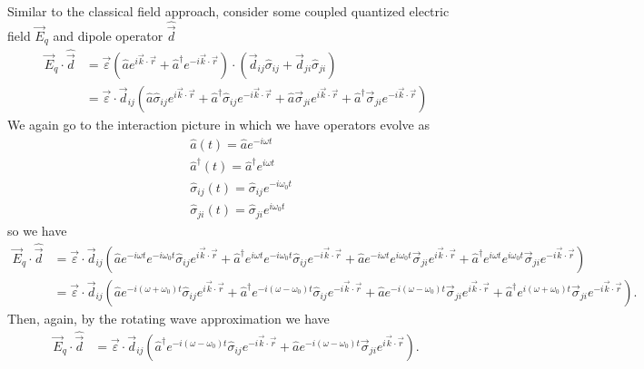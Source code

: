 \documentclass[aps,pra,showpacs,amsmath,amssymb,nofootinbib,longbibliography,superscriptaddress
]{revtex4-1}
\theoremstyle{definition}
\theoremstyle{remark}
\newcommand{\0}{\hat{0}}
\begin{document}
Similar to the classical field approach, consider some coupled quantized electric field $\vec{E}_q$ and dipole operator $\hat{\vec{d}}$
\begin{align}
    \vec{E}_q \cdot \hat{\vec{d}} &=
    \vec{\varepsilon} \left(\hat{a} e^{i \vec{k} \cdot \vec{r}} + \hat{a}^{\dagger} e^{-i \vec{k} \cdot \vec{r}}\right) \cdot \left(\vec{d}_{ij} \hat{\sigma}_{ij} + \vec{d}_{ji} \hat{\sigma}_{ji}\right)\nonumber \\
    &=
    \vec{\varepsilon} \cdot \vec{d}_{ij}\left(
        \hat{a} \hat{\sigma}_{ij} e^{i \vec{k} \cdot \vec{r}} +
        \hat{a}^{\dagger} \hat{\sigma}_{ij} e^{-i \vec{k} \cdot \vec{r}} +
        \hat{a} \vec{\sigma}_{ji} e^{i \vec{k} \cdot \vec{r}} +
        \hat{a}^{\dagger} \vec{\sigma}_{ji} e^{-i \vec{k} \cdot \vec{r}}
    \right)
\end{align}
We again go to the interaction picture in which we have operators evolve as
\begin{align}
    &\hat{a}(t) = \hat{a} e^{-i \omega t}\\
    &\hat{a}^{\dagger}(t) = \hat{a}^{\dagger} e^{i \omega t}\\
    &\hat{\sigma}_{ij}(t) = \hat{\sigma}_{ij} e^{-i \omega_0 t}\\
    &\hat{\sigma}_{ji}(t) = \hat{\sigma}_{ji} e^{i \omega_0 t}
\end{align}
so we have
\begin{align}
    \vec{E}_q \cdot \hat{\vec{d}} &=
    \vec{\varepsilon} \cdot \vec{d}_{ij}\left(
        \hat{a} e^{-i \omega t} e^{-i \omega_0 t} \hat{\sigma}_{ij} e^{i \vec{k} \cdot \vec{r}} +
        \hat{a}^{\dagger} e^{i \omega t} e^{-i \omega_0 t} \hat{\sigma}_{ij} e^{-i \vec{k} \cdot \vec{r}} +
        \hat{a} e^{-i \omega t} e^{i \omega_0 t}\vec{\sigma}_{ji} e^{i \vec{k} \cdot \vec{r}} +
        \hat{a}^{\dagger} e^{i \omega t} e^{i \omega_0 t}\vec{\sigma}_{ji} e^{-i \vec{k} \cdot \vec{r}}
    \right) \nonumber \\
    &=
    \vec{\varepsilon} \cdot \vec{d}_{ij}\left(
        \hat{a} e^{-i (\omega + \omega_0) t} \hat{\sigma}_{ij} e^{i \vec{k} \cdot \vec{r}} +
        \hat{a}^{\dagger} e^{-i (\omega - \omega_0) t} \hat{\sigma}_{ij} e^{-i \vec{k} \cdot \vec{r}} +
        \hat{a} e^{-i (\omega - \omega_0) t}\vec{\sigma}_{ji} e^{i \vec{k} \cdot \vec{r}} +
        \hat{a}^{\dagger} e^{i (\omega +\omega_0) t}\vec{\sigma}_{ji} e^{-i \vec{k} \cdot \vec{r}}
    \right). 
\end{align}
Then, again, by the rotating wave approximation we have
\begin{align}
    \vec{E}_q \cdot \hat{\vec{d}} &=
    \vec{\varepsilon} \cdot \vec{d}_{ij}\left(
        \hat{a}^{\dagger} e^{-i (\omega - \omega_0) t} \hat{\sigma}_{ij} e^{-i \vec{k} \cdot \vec{r}} +
        \hat{a} e^{-i (\omega - \omega_0) t}\vec{\sigma}_{ji} e^{i \vec{k} \cdot \vec{r}}
    \right). 
\end{align}
\end{document}

